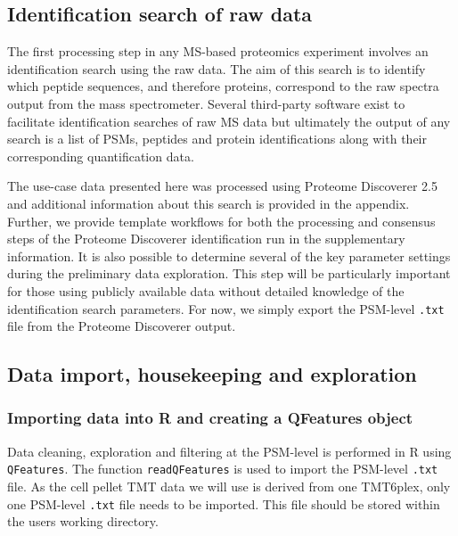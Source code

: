 \documentclass[9pt,a4paper,]{extarticle}
\begin{document}
\hypertarget{identification-search-of-raw-data}{%
\subsection{Identification search of raw data}\label{identification-search-of-raw-data}}

The first processing step in any MS-based proteomics experiment involves an
identification search using the raw data. The aim of this search is to identify
which peptide sequences, and therefore proteins, correspond to the raw spectra
output from the mass spectrometer. Several third-party software exist to
facilitate identification searches of raw MS data but ultimately the output of
any search is a list of PSMs, peptides and protein identifications along with
their corresponding quantification data.

The use-case data presented here was processed using Proteome Discoverer 2.5 and
additional information about this search is provided in the appendix. Further,
we provide template workflows for both the processing and consensus steps of the
Proteome Discoverer identification run in the supplementary information. It is
also possible to determine several of the key parameter settings during the
preliminary data exploration. This step will be particularly important for those
using publicly available data without detailed knowledge of the identification
search parameters. For now, we simply export the PSM-level \texttt{.txt} file from the
Proteome Discoverer output.

\hypertarget{data-import-housekeeping-and-exploration}{%
\subsection{Data import, housekeeping and exploration}\label{data-import-housekeeping-and-exploration}}

\hypertarget{importing-data-into-r-and-creating-a-qfeatures-object}{%
\subsubsection{Importing data into R and creating a QFeatures object}\label{importing-data-into-r-and-creating-a-qfeatures-object}}

Data cleaning, exploration and filtering at the PSM-level is performed in R
using \texttt{QFeatures}. The function \texttt{readQFeatures} is used to import the PSM-level
\texttt{.txt} file. As the cell pellet TMT data we will use is derived from one
TMT6plex, only one PSM-level \texttt{.txt} file needs to be imported. This file should
be stored within the users working directory.
\end{document}

